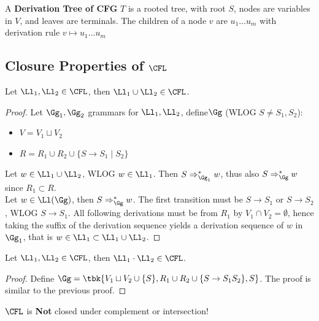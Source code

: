 \begin{yellowBox}
	\begin{defn}
		A \textbf{Derivation Tree of CFG} $T$ is a rooted tree, with root $S$, nodes are variables in $V$, and leaves are terminals. The children of a node $v$ are $u_1\ldots u_m$ with derivation rule $v\mapsto u_1\ldots u_m$
	\end{defn}
\end{yellowBox}
\subsection{Closure Properties of $\CFL$}
\begin{blueBox}
	\begin{thm}[Union]
		Let $\Ll_1, \Ll_2\in \CFL$, then $\Ll_1\cup \Ll_2\in \CFL$.
	\end{thm}
\end{blueBox}
\begin{proof}
	Let $\Gg_1, \Gg_2$ grammars for $\Ll_1, \Ll_2$, define$\Gg$ (WLOG $S\neq S_1, S_2$):
	\begin{itemize}
		\item $V = V_1\sqcup V_2$
		\item $R = R_1\cup R_2 \cup \{S\to S_1\mid S_2\}$
	\end{itemize}
Let $w\in \Ll_1\cup \Ll_2$, WLOG $w\in \Ll_1$. Then $S\Rightarrow^*_{\Gg_1} w$, thus also $S\Rightarrow^*_\Gg w$ since $R_1\subset R$.\\
Let $w\in \Ll(\Gg)$, then $S\Rightarrow^*_\Gg w$. The first transition must be $S\to S_1$ or $S\to S_2$, WLOG $S\to S_1$. All following derivations must be from $R_1$ by $V_1\cap V_2 = \emptyset$, hence taking the suffix of the derivation sequence yields a derivation sequence of $w$ in $\Gg_1$, that is $w\in \Ll_1\subset \Ll_1\cup \Ll_2$.
\end{proof}
\begin{blueBox}
	\begin{thm}[Concatenation]
		Let $\Ll_1, \Ll_2\in \CFL$, then $\Ll_1\cdot \Ll_2\in \CFL$.
	\end{thm}
\end{blueBox}
\begin{proof}
	Define $\Gg = \tbk{V_1\sqcup V_2 \cup \{S\}, R_1\cup R_2\cup\{S\to S_1S_2\}, S}$. The proof is similar to the previous proof.
\end{proof}
\begin{remark}
	$\CFL$ is \textbf{Not} closed under complement or intersection!
\end{remark}
